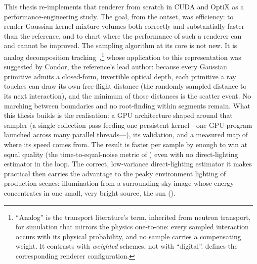 This thesis re-implements that renderer from scratch in CUDA and OptiX as a performance-engineering
study. The goal, from the outset, was efficiency: to render Gaussian kernel-mixture volumes both
correctly and substantially faster than the reference, and to chart where the performance of such a
renderer can and cannot be improved. The sampling algorithm at its core is not new. It is
analog decomposition tracking~\cite{Kutz2017},\footnote{``Analog'' is the transport
literature's term, inherited from neutron transport, for simulation that mirrors the
physics one-to-one: every sampled interaction occurs with its physical probability, and no
sample carries a compensating weight. It contrasts with \emph{weighted} schemes, not with
``digital''.  defines the corresponding renderer
configuration.} whose application to this representation was
suggested by Condor, the reference's lead author: because every Gaussian primitive admits a
closed-form, invertible optical depth, each primitive a ray touches can draw its own
free-flight distance (the randomly sampled distance to its next interaction), and the
minimum of those distances is the scatter event. No marching
between boundaries and no root-finding within segments remain. What this thesis builds is
the realisation: a GPU architecture shaped around that sampler (a single collection pass feeding one persistent kernel---one GPU program launched across
many parallel threads---), its validation, and a measured map of
where its speed comes from. The result is faster per sample by
enough to win at equal quality (the time-to-equal-noise metric of )
even with no direct-lighting estimator in the loop. The correct,
low-variance direct-lighting estimator it makes practical then carries the advantage to the peaky environment lighting of production scenes: illumination
from a surrounding sky image whose energy concentrates in one small, very bright source,
the sun ().

